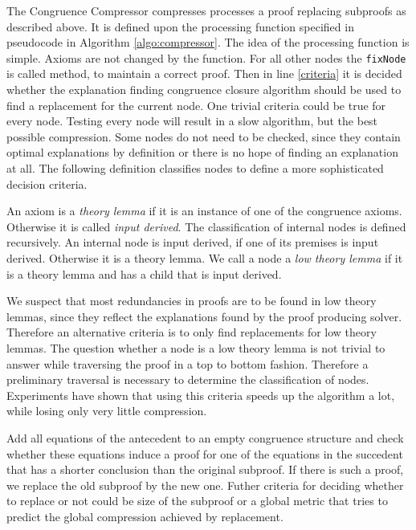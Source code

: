 The Congruence Compressor compresses processes a proof replacing subproofs as described above. 
It is defined upon the processing function specified in pseudocode in Algorithm \ref{algo:compressor}.
The idea of the processing function is simple.
Axioms are not changed by the function.
For all other nodes the \texttt{fixNode} is called method, to maintain a correct proof.
Then in line \ref{criteria} it is decided whether the explanation finding congruence closure algorithm should be used to find a replacement for the current node.
One trivial criteria could be true for every node.
Testing every node will result in a slow algorithm, but the best possible compression.
Some nodes do not need to be checked, since they contain optimal explanations by definition or there is no hope of finding an explanation at all.
The following definition classifies nodes to define a more sophisticated decision criteria.

\begin{definition}

An axiom is a \emph{theory lemma} if it is an instance of one of the congruence axioms.
Otherwise it is called \emph{input derived}.
The classification of internal nodes is defined recursively.
An internal node is input derived, if one of its premises is input derived.
Otherwise it is a theory lemma.
We call a node a \emph{low theory lemma} if it is a theory lemma and has a child that is input derived.

\end{definition}

We suspect that most redundancies in proofs are to be found in low theory lemmas, since they reflect the explanations found by the proof producing solver.
Therefore an alternative criteria is to only find replacements for low theory lemmas.
The question whether a node is a low theory lemma is not trivial to answer while traversing the proof in a top to bottom fashion.
Therefore a preliminary traversal is necessary to determine the classification of nodes.
Experiments have shown that using this criteria speeds up the algorithm a lot, while losing only very little compression.

Add all equations of the antecedent to an empty congruence structure and check whether these equations induce a proof for one of the equations in the succedent that has a shorter conclusion than the original subproof.
If there is such a proof, we replace the old subproof by the new one.
Futher criteria for deciding whether to replace or not could be size of the subproof or a global metric that tries to predict the global compression achieved by replacement.

